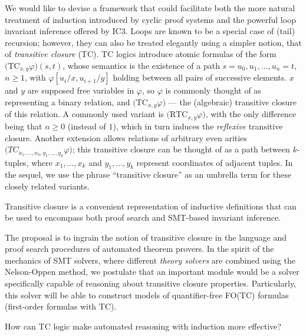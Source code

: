 We would like to devise a framework that could facilitate both the more natural treatment of induction introduced by cyclic proof systems and the powerful loop invariant inference offered by IC3.
Loops are known to be a special case of (tail) recursion; however, they can also be treated elegantly using a simpler notion, that of \emph{transitive closure} (TC).
TC logics introduce atomic formulas of the form $\big(\mathrm{TC}_{x,y}\varphi\big)(s,t)$,
whose semantics is the existence of a path $s=u_0,u_1,\ldots,u_n=t$, $n\geq 1$, with $\varphi[u_i/x,u_{i+1}/y]$
holding between all pairs of successive elements.
$x$ and $y$ are supposed free variables in $\varphi$, so $\varphi$ is commonly thought of as representing a binary relation, and $\big(\mathrm{TC}_{x,y}\varphi\big)$ --- the (algebraic) transitive closure of this relation.
A commonly used variant is $\big(\mathrm{RTC}_{x,y}\varphi\big)$, with the only difference being that $n\geq 0$ (instead of $1$),
which in turn induces the \emph{reflexive} transitive closure.
Another extension allows relations of arbitrary even arities
$\big(TC_{x_1,\ldots,x_k,y_1,\ldots,y_k}\varphi\big)$;
this transitive closure can be thought of as a path between $k$-tuples, where $x_1,\ldots,x_k$ and $y_1,\ldots,y_k$ represent coordinates of adjacent tuples.
In the sequel, we use the phrase ``transitive closure'' as an umbrella term for these closely related variants.

\begin{proposal}Transitive closure is a convenient representation of inductive definitions that can be used to encompass both proof search and SMT-based invariant inference.
\end{proposal}


The proposal is to ingrain the notion of transitive closure in the language and proof search procedures of automated theorem provers.
In the spirit of the mechanics of SMT solvers, where different \emph{theory solvers} are combined using the Nelson-Oppen method,
we postulate that an important module would be a solver specifically capable of reasoning
about transitive closure properties.
Particularly, this solver will be able to construct models of quantifier-free
FO(TC) formulas (first-order formulas with TC).

\begin{researchquestion}How can TC logic make automated reasoning with induction more effective?
\end{researchquestion}

